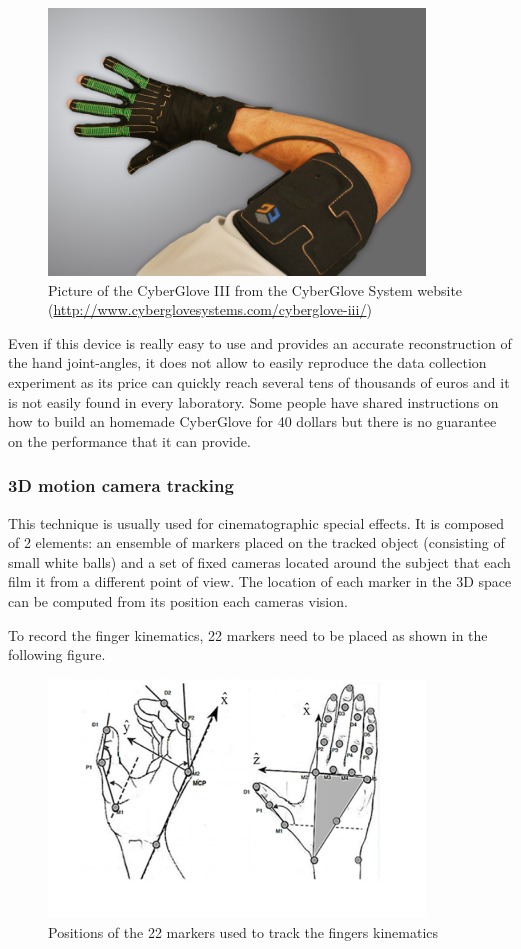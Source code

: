 \documentclass{article}
\begin{document}
\begin{figure}[h]
    \centering
    \includegraphics[width=10cm]{images/cyberGlove3.png}
    \caption{Picture of the CyberGlove III from the CyberGlove System website (\url{http://www.cyberglovesystems.com/cyberglove-iii/})}
    \label{fig:cyberGlove3}
\end{figure}

Even if this device is really easy to use and provides an accurate reconstruction of the hand joint-angles, it does not allow to easily reproduce the data collection experiment as its price can quickly reach several tens of thousands of euros and it is not easily found in every laboratory. Some people have shared instructions on how to build an homemade CyberGlove for 40 dollars \cite{ref:diyCyberGlove} but there is no guarantee on the performance that it can provide.


\subsubsection{3D motion camera tracking}

This technique is usually used for cinematographic special effects. It is composed of 2 elements: an ensemble of markers placed on the tracked object (consisting of small white balls) and a set of fixed cameras located around the subject that each film it from a different point of view. The location of each marker in the 3D space can be computed from its position each cameras vision.

To record the finger kinematics, 22 markers need to be placed as shown in the following figure.

\begin{figure}[h]
    \centering
    \includegraphics[width=10cm]{images/motionCaptureMarker.png}
    \caption{Positions of the 22 markers used to track the fingers kinematics \cite{ref:Ngeo2014}}
    \label{fig:cyberGlove3}
\end{figure}
\end{document}
